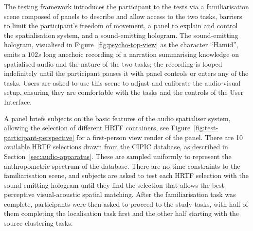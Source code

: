 The testing framework introduces the participant to the tests via a familiarisation scene composed of panels to describe and allow access to the two tasks, barriers to limit the participant's freedom of movement, a panel to explain and control the spatialisation system, and a sound-emitting hologram. The sound-emitting hologram, visualised in Figure~\ref{fig:psycho-top-view} as the character ``Hamid'', emits a $102s$ long anechoic recording of a narration summarising knowledge on spatialised audio and the nature of the two tasks; the recording is looped indefinitely until the participant pauses it with panel controls or enters any of the tasks. Users are asked to use this scene to adjust and calibrate the audio-visual setup, ensuring they are comfortable with the tasks and the controls of the User Interface. \par
A panel briefs subjects on the basic features of the audio spatialiser system, allowing the selection of different HRTF containers, see Figure~\ref{fig:test-participant-perspective} for a first-person view render of the panel. There are 10 available HRTF selections drawn from the CIPIC database, as described in Section~\ref{sec:audio-apparatus}. These are sampled uniformly to represent the anthropometric spectrum of the database. There are no time constraints to the familiarisation scene, and subjects are asked to test each HRTF selection with the sound-emitting hologram until they find the selection that allows the best perceptive visual-acoustic spatial matching. After the familiarisation task was complete, participants were then asked to proceed to the study tasks, with half of them completing the localisation task first and the other half starting with the source clustering tasks.\par

